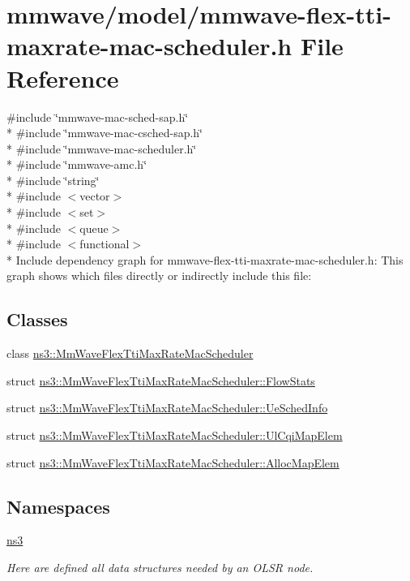 \hypertarget{mmwave-flex-tti-maxrate-mac-scheduler_8h}{}\section{mmwave/model/mmwave-\/flex-\/tti-\/maxrate-\/mac-\/scheduler.h File Reference}
\label{mmwave-flex-tti-maxrate-mac-scheduler_8h}
{\ttfamily \#include \char`\"{}mmwave-\/mac-\/sched-\/sap.\+h\char`\"{}}\\*
{\ttfamily \#include \char`\"{}mmwave-\/mac-\/csched-\/sap.\+h\char`\"{}}\\*
{\ttfamily \#include \char`\"{}mmwave-\/mac-\/scheduler.\+h\char`\"{}}\\*
{\ttfamily \#include \char`\"{}mmwave-\/amc.\+h\char`\"{}}\\*
{\ttfamily \#include \char`\"{}string\char`\"{}}\\*
{\ttfamily \#include $<$vector$>$}\\*
{\ttfamily \#include $<$set$>$}\\*
{\ttfamily \#include $<$queue$>$}\\*
{\ttfamily \#include $<$functional$>$}\\*
Include dependency graph for mmwave-\/flex-\/tti-\/maxrate-\/mac-\/scheduler.h\+:
This graph shows which files directly or indirectly include this file\+:
\subsection*{Classes}
\begin{DoxyCompactItemize}
\item 
class \hyperlink{classns3_1_1MmWaveFlexTtiMaxRateMacScheduler}{ns3\+::\+Mm\+Wave\+Flex\+Tti\+Max\+Rate\+Mac\+Scheduler}
\item 
struct \hyperlink{structns3_1_1MmWaveFlexTtiMaxRateMacScheduler_1_1FlowStats}{ns3\+::\+Mm\+Wave\+Flex\+Tti\+Max\+Rate\+Mac\+Scheduler\+::\+Flow\+Stats}
\item 
struct \hyperlink{structns3_1_1MmWaveFlexTtiMaxRateMacScheduler_1_1UeSchedInfo}{ns3\+::\+Mm\+Wave\+Flex\+Tti\+Max\+Rate\+Mac\+Scheduler\+::\+Ue\+Sched\+Info}
\item 
struct \hyperlink{structns3_1_1MmWaveFlexTtiMaxRateMacScheduler_1_1UlCqiMapElem}{ns3\+::\+Mm\+Wave\+Flex\+Tti\+Max\+Rate\+Mac\+Scheduler\+::\+Ul\+Cqi\+Map\+Elem}
\item 
struct \hyperlink{structns3_1_1MmWaveFlexTtiMaxRateMacScheduler_1_1AllocMapElem}{ns3\+::\+Mm\+Wave\+Flex\+Tti\+Max\+Rate\+Mac\+Scheduler\+::\+Alloc\+Map\+Elem}
\end{DoxyCompactItemize}
\subsection*{Namespaces}
\begin{DoxyCompactItemize}
\item 
 \hyperlink{namespacens3}{ns3}
\begin{DoxyCompactList}\small\item\em Here are defined all data structures needed by an O\+L\+SR node. \end{DoxyCompactList}\end{DoxyCompactItemize}
